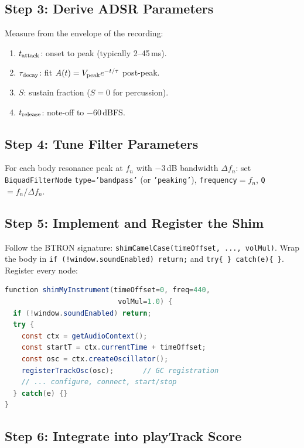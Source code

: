 \documentclass[10pt,journal,compsoc,twocolumn]{article}
\begin{document}
\subsection{Step 3: Derive ADSR Parameters}

Measure from the envelope of the recording:
\begin{enumerate}[leftmargin=*]
    \item $t_{\rm attack}$: onset to peak (typically 2--45\,ms).
    \item $\tau_{\rm decay}$: fit $A(t)=V_{\rm peak}e^{-t/\tau}$ post-peak.
    \item $S$: sustain fraction ($S=0$ for percussion).
    \item $t_{\rm release}$: note-off to $-60$\,dBFS.
\end{enumerate}

\subsection{Step 4: Tune Filter Parameters}

For each body resonance peak at $f_n$ with $-3$\,dB bandwidth $\Delta f_n$:
set \texttt{BiquadFilterNode} \texttt{type='bandpass'} (or \texttt{'peaking'}),
\texttt{frequency}$=f_n$, \texttt{Q}$=f_n/\Delta f_n$.

\subsection{Step 5: Implement and Register the Shim}

Follow the BTRON signature: \texttt{shimCamelCase(timeOffset, ..., volMul)}.
Wrap the body in \texttt{if (!window.soundEnabled) return;} and
\texttt{try\{~\}\,catch(e)\{~\}}.  Register every node:

\begin{lstlisting}[language=Java,
    caption={Mandatory shim skeleton for new instruments.}]
function shimMyInstrument(timeOffset=0, freq=440,
                           volMul=1.0) {
  if (!window.soundEnabled) return;
  try {
    const ctx = getAudioContext();
    const startT = ctx.currentTime + timeOffset;
    const osc = ctx.createOscillator();
    registerTrackOsc(osc);       // GC registration
    // ... configure, connect, start/stop
  } catch(e) {}
}
\end{lstlisting}

\subsection{Step 6: Integrate into playTrack Score}
\end{document}
